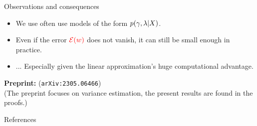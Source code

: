

\begin{frame}{Observations and consequences}


\begin{minipage}{0.48\textwidth}
    \ElectionData{}
\end{minipage}
\begin{minipage}{0.48\textwidth}
    \ElectionResultsGlobal{}
\end{minipage}


\pause
%
\begin{itemize}
\item We use often use models of the form $p(\gamma, \lambda \vert X)$.
\item Even if the error $\textcolor{red}{\mathcal{E}(w)}$ does not vanish,
      it can still be small enough in practice.
      \item[] ... Especially given the linear approximation's huge computational advantage.
\end{itemize}


\textbf{Preprint: }\citet{giordano:2023:bayesij} (\texttt{arXiv:2305.06466})\\
(The preprint focuses on variance estimation, the present results are found in the proofs.)
    
\end{frame}




\begin{frame}{References}

\footnotesize


\begingroup
\renewcommand{\section}[2]{}%

\endgroup

%
\end{frame}
